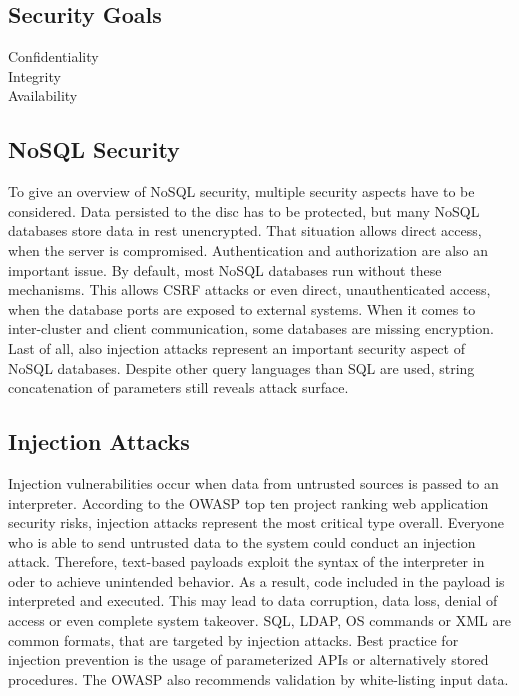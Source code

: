 \subsection{Security Goals}
\begin{description}
\item [Confidentiality] 
\item [Integrity] 
\item [Availability]
\end{description}


\subsection{NoSQL Security}
To give an overview of NoSQL security, multiple security aspects have to be considered. Data persisted to the disc has to be protected, but many NoSQL databases store data in rest unencrypted. That situation allows direct access, when the server is compromised. Authentication and authorization are also an important issue. By default, most NoSQL databases run without these mechanisms. This allows CSRF attacks or even direct, unauthenticated access, when the database ports are exposed to external systems. When it comes to inter-cluster and client communication, some databases are missing encryption. Last of all, also injection attacks represent an important security aspect of NoSQL databases. Despite other query languages than SQL are used, string concatenation of parameters still reveals attack surface.    

\subsection{Injection Attacks}
Injection vulnerabilities occur when data from untrusted sources is passed to an interpreter. According to the OWASP top ten project ranking web application security risks, injection attacks represent the most critical type overall. Everyone who is able to send untrusted data to the system could conduct an injection attack. Therefore, text-based payloads exploit the syntax of the interpreter in oder to achieve unintended behavior. As a result, code included in the payload is interpreted and executed. This may lead to data corruption, data loss, denial of access or even complete system takeover. SQL, LDAP, OS commands or XML are common formats, that are targeted by injection attacks. Best practice for injection prevention is the usage of parameterized APIs or alternatively stored procedures. The OWASP also recommends validation by white-listing input data.

